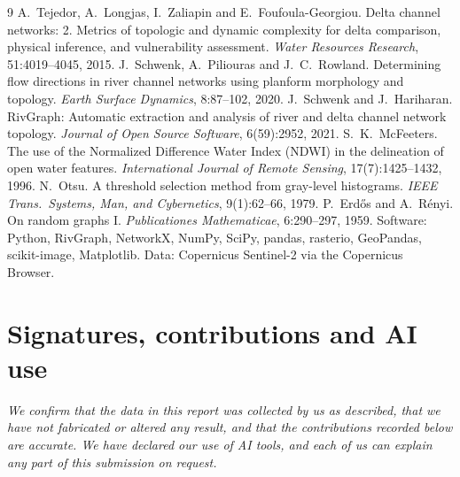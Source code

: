 \documentclass[11pt,a4paper]{article}
\begin{document}
\begin{thebibliography}{9}\small
{} A.~Tejedor, A.~Longjas, I.~Zaliapin and E.~Foufoula-Georgiou. Delta channel networks: 2. Metrics of topologic and dynamic complexity for delta comparison, physical inference, and vulnerability assessment. \emph{Water Resources Research}, 51:4019--4045, 2015.
 J.~Schwenk, A.~Piliouras and J.~C.~Rowland. Determining flow directions in river channel networks using planform morphology and topology. \emph{Earth Surface Dynamics}, 8:87--102, 2020.
 J.~Schwenk and J.~Hariharan. RivGraph: Automatic extraction and analysis of river and delta channel network topology. \emph{Journal of Open Source Software}, 6(59):2952, 2021.
 S.~K.~McFeeters. The use of the Normalized Difference Water Index (NDWI) in the delineation of open water features. \emph{International Journal of Remote Sensing}, 17(7):1425--1432, 1996.
 N.~Otsu. A threshold selection method from gray-level histograms. \emph{IEEE Trans.\ Systems, Man, and Cybernetics}, 9(1):62--66, 1979.
 P.~Erdős and A.~Rényi. On random graphs I. \emph{Publicationes Mathematicae}, 6:290--297, 1959.
 Software: Python, RivGraph, NetworkX, NumPy, SciPy, pandas, rasterio, GeoPandas, scikit-image, Matplotlib. Data: Copernicus Sentinel-2 via the Copernicus Browser.
\end{thebibliography}

\newpage
\section*{Signatures, contributions and AI use}

\emph{We confirm that the data in this report was collected by us as described, that we have not fabricated or altered any result, and that the contributions recorded below are accurate. We have declared our use of AI tools, and each of us can explain any part of this submission on request.}
\end{document}
